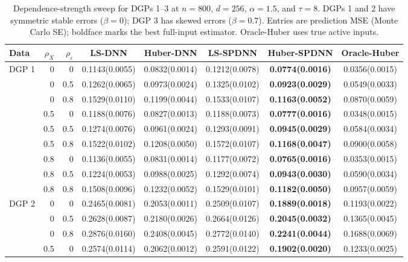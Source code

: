 \begin{table}[!ht]
\centering
\caption{Dependence-strength sweep for DGPs 1--3 at $n=800$, $d=256$, $\alpha=1.5$, and $\tau=8$. DGPs 1 and 2 have symmetric stable errors ($\beta=0$); DGP 3 has skewed errors ($\beta=0.7$). Entries are prediction MSE (Monte Carlo SE); boldface marks the best full-input estimator. Oracle-Huber uses true active inputs.}
\label{tab:dependence-strength}
\begin{adjustbox}{max width=\linewidth}
\begin{tabular}{@{}lrrccccc@{}}
\toprule
Data & $\rho_X$ & $\rho_\varepsilon$ & LS-DNN & Huber-DNN & LS-SPDNN & Huber-SPDNN & Oracle-Huber\\
\midrule
\multirow{9}{*}{DGP 1} & 0 & 0 & 0.1143(0.0055) & 0.0832(0.0014) & 0.1212(0.0078) & \textbf{0.0774(0.0016)} & 0.0356(0.0015)\\
 & 0 & 0.5 & 0.1262(0.0065) & 0.0973(0.0024) & 0.1325(0.0102) & \textbf{0.0923(0.0029)} & 0.0549(0.0033)\\
 & 0 & 0.8 & 0.1529(0.0110) & 0.1199(0.0044) & 0.1533(0.0107) & \textbf{0.1163(0.0052)} & 0.0870(0.0059)\\
 & 0.5 & 0 & 0.1188(0.0076) & 0.0827(0.0013) & 0.1188(0.0073) & \textbf{0.0777(0.0016)} & 0.0348(0.0015)\\
 & 0.5 & 0.5 & 0.1274(0.0076) & 0.0961(0.0024) & 0.1293(0.0091) & \textbf{0.0945(0.0029)} & 0.0584(0.0034)\\
 & 0.5 & 0.8 & 0.1522(0.0102) & 0.1208(0.0050) & 0.1572(0.0107) & \textbf{0.1168(0.0047)} & 0.0900(0.0058)\\
 & 0.8 & 0 & 0.1136(0.0055) & 0.0831(0.0014) & 0.1177(0.0072) & \textbf{0.0765(0.0016)} & 0.0353(0.0015)\\
 & 0.8 & 0.5 & 0.1224(0.0053) & 0.0988(0.0025) & 0.1292(0.0074) & \textbf{0.0943(0.0030)} & 0.0590(0.0034)\\
 & 0.8 & 0.8 & 0.1508(0.0096) & 0.1232(0.0052) & 0.1529(0.0101) & \textbf{0.1182(0.0050)} & 0.0957(0.0059)\\
\midrule
\multirow{9}{*}{DGP 2} & 0 & 0 & 0.2465(0.0081) & 0.2053(0.0011) & 0.2509(0.0107) & \textbf{0.1889(0.0018)} & 0.1193(0.0022)\\
 & 0 & 0.5 & 0.2628(0.0087) & 0.2180(0.0026) & 0.2664(0.0126) & \textbf{0.2045(0.0032)} & 0.1365(0.0045)\\
 & 0 & 0.8 & 0.2876(0.0160) & 0.2408(0.0045) & 0.2772(0.0140) & \textbf{0.2241(0.0044)} & 0.1688(0.0069)\\
 & 0.5 & 0 & 0.2574(0.0114) & 0.2062(0.0012) & 0.2591(0.0122) & \textbf{0.1902(0.0020)} & 0.1233(0.0025)\\

\end{tabular}
\end{adjustbox}
\end{table}
